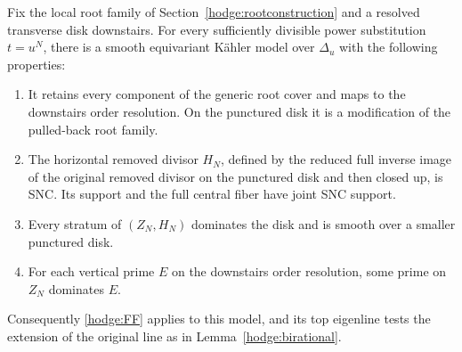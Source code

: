 \begin{lemma}
\label{orders:diskmodels}
Fix the local root family of Section~\ref{hodge:rootconstruction}
and a resolved transverse disk downstairs.  For every sufficiently
divisible power substitution \(t=u^N\), there is a smooth
equivariant K\"ahler model over \(\Delta_u\) with the following
properties:
\begin{enumerate}[label=\textup{(\roman*)}]
\item
It retains every component of the generic root cover and maps to
the downstairs order resolution.  On the punctured disk it is a
modification of the pulled-back root family.
\item
The horizontal removed divisor \(H_N\), defined by the reduced full
inverse image of the original removed divisor on the punctured
disk and then closed up, is SNC.  Its support and the full central
fiber have joint SNC support.
\item
Every stratum of \((Z_N,H_N)\) dominates the disk and is smooth
over a smaller punctured disk.
\item
For each vertical prime \(E\) on the downstairs order resolution,
some prime on \(Z_N\) dominates \(E\).
\end{enumerate}
Consequently \eqref{hodge:FF} applies to this model, and its top
eigenline tests the extension of the original line as in
Lemma~\ref{hodge:birational}.
\end{lemma}

